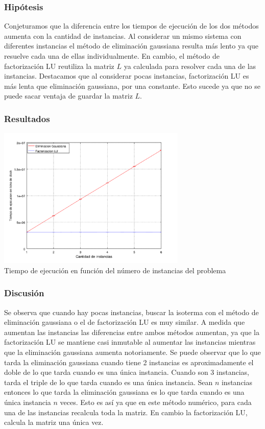       \subsubsection*{Hipótesis}
          Conjeturamos que la diferencia entre los tiempos de ejecución de los dos métodos aumenta con la cantidad de instancias. 
          Al considerar un mismo sistema con diferentes instancias el método de eliminación gaussiana resulta más lento ya que resuelve cada una de ellas individualmente. En cambio, el método de factorización LU reutiliza la matriz $L$ ya calculada para resolver cada una de las instancias. 
          Destacamos que al considerar pocas instancias, factorización LU es más lenta que eliminación gaussiana, por una constante. Esto sucede ya que no se puede sacar ventaja de guardar la matriz $L$. 

      \subsubsection*{Resultados}
        
        \begin{center}
          \includegraphics[width=9cm]{graficos/exp2/exp2.png} \\
          {\small Tiempo de ejecución en función del número de instancias del problema}
        \end{center}


      \subsubsection*{Discusión}
          Se observa que cuando hay pocas instancias, buscar la isoterma con el método de eliminación gaussiana o el de factorización LU es muy similar. 
          A medida que aumentan las instancias las diferencias entre ambos métodos aumentan, ya que la factorización LU se mantiene casi inmutable al aumentar las instancias mientras que la eliminación gaussiana aumenta notoriamente. 
          Se puede observar que lo que tarda la eliminación gaussiana cuando tiene 2 instancias es aproximadamente el doble de lo que tarda cuando es una única instancia. Cuando son 3 instancias, tarda el triple de lo que tarda cuando es una única instancia. 
          Sean $n$ instancias entonces lo que tarda la eliminación gaussiana es lo que tarda cuando es una única instancia $n$ veces. Esto es así ya que en este método numérico, para cada una de las instancias recalcula toda la matriz. En cambio la factorización LU, calcula la matriz una única vez.



